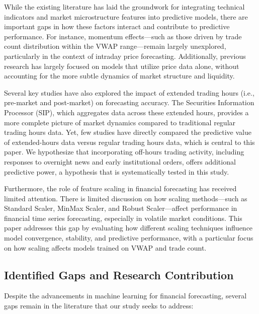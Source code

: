 \documentclass[letterpaper]{article}
\begin{document}
While the existing literature has laid the groundwork for integrating technical indicators and market microstructure features into predictive models, there are important gaps in how these factors interact and contribute to predictive performance. For instance, momentum effects—such as those driven by trade count distribution within the VWAP range—remain largely unexplored, particularly in the context of intraday price forecasting. Additionally, previous research has largely focused on models that utilize price data alone, without accounting for the more subtle dynamics of market structure and liquidity.

Several key studies have also explored the impact of extended trading hours (i.e., pre-market and post-market) on forecasting accuracy. The Securities Information Processor (SIP), which aggregates data across these extended hours, provides a more complete picture of market dynamics compared to traditional regular trading hours data. Yet, few studies have directly compared the predictive value of extended-hours data versus regular trading hours data, which is central to this paper. We hypothesize that incorporating off-hours trading activity, including responses to overnight news and early institutional orders, offers additional predictive power, a hypothesis that is systematically tested in this study.

Furthermore, the role of feature scaling in financial forecasting has received limited attention. There is limited discussion on how scaling methods—such as Standard Scaler, MinMax Scaler, and Robust Scaler—affect performance in financial time series forecasting, especially in volatile market conditions. This paper addresses this gap by evaluating how different scaling techniques influence model convergence, stability, and predictive performance, with a particular focus on how scaling affects models trained on VWAP and trade count.

\subsection{Identified Gaps and Research Contribution}

Despite the advancements in machine learning for financial forecasting, several gaps remain in the literature that our study seeks to address:
\end{document}
